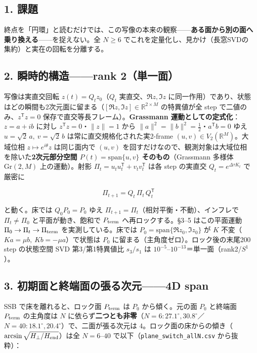 \documentclass[
  a4paper,
]{ltjsarticle}
\begin{document}
\subsection{1. 課題}\label{ux8ab2ux984c}

終点を「円環」と読むだけでは、この写像の本来の観察------\textbf{ある面から別の面へ乗り換える}------を捉えない。全
\(N\ge6\)
でこれを定量化し、見かけ（長窓SVDの集約）と実在の回転を分離する。

\subsection{2. 瞬時的構造------rank
2（単一面）}\label{ux77acux6642ux7684ux69cbux9020rank-2ux5358ux4e00ux9762}

写像は実直交回転 \(z(t)=Q_t z_0\)（\(Q_t\) 実直交、\(\Re z,\Im z\)
に同一作用）であり、状態はどの瞬間も2次元面に留まる（\([\Re z,\Im z]\in\mathbb R^{2\times M}\)
の特異値が全 step で二値のみ、\(z^{\mathsf T}z=0\)
保存で直交等長フレーム）。\textbf{Grassmann
運動としての定式化}：\(z=a+ib\) に対し \(z^{\mathsf T}z=0\)・\(\|z\|=1\)
から \(\|a\|^2=\|b\|^2=\tfrac12\)・\(a^{\mathsf T}b=0\) ゆえ
\(u=\sqrt2\,a,\ v=\sqrt2\,b\) は常に直交規格化された実2-frame
\((u,v)\in V_2(\mathbb R^M)\)。大域位相 \(z\mapsto e^{i\theta}z\)
は同じ面内で \((u,v)\)
を回すだけなので、観測対象は大域位相を除いた\textbf{2次元部分空間
\(P(t)=\mathrm{span}\{u,v\}\) そのもの}（Grassmann 多様体
\(\mathrm{Gr}(2,M)\) 上の運動）。射影
\(\Pi_t=u_tu_t^{\mathsf T}+v_tv_t^{\mathsf T}\) は各 step の実直交
\(Q_t=e^{\Delta\tau K_t}\) で厳密に

\[\Pi_{t+1}=Q_t\,\Pi_t\,Q_t^{\mathsf T}\]

と動く。床では \(Q_0P_0=P_0\) ゆえ
\(\Pi_{t+1}=\Pi_t\)（相対平衡・不動）、インフレで \(\Pi_t\neq\Pi_0\)
と平面が動き、飽和で \(P_{\rm term}\) へ再ロックする。§3--5
はこの平面運動 \(\Pi_0\to\Pi_t\to\Pi_{\rm term}\) を実測している。床では
\(P_0=\mathrm{span}\{\Re z_0,\Im z_0\}\) が \(K\)
不変（\(Ka=\mu b,\ Kb=-\mu a\)）で状態は \(P_0\)
に留まる（主角度ゼロ）。ロック後の末尾200 step の状態空間 SVD
第3/第1特異値比 \(s_3/s_1\) は
\(10^{-5}\)--\(10^{-13}\)＝単一面（rank2/\(S^1\)）。

\subsection{3. 初期面と終端面の張る次元------4D
span}\label{ux521dux671fux9762ux3068ux7d42ux7aefux9762ux306eux5f35ux308bux6b21ux51434d-span}

SSB で床を離れると、ロック面 \(P_{\rm term}\) は \(P_0\)
から傾く。元の面 \(P_0\) と終端面 \(P_{\rm term}\) の主角度は \(N\)
に依らず\textbf{二つとも非零}（\(N=6{:}27.1^\circ,30.8^\circ\)／\(N=40{:}18.1^\circ,20.4^\circ\)）で、二面が張る次元は
\(4\)。ロック面の床からの傾き（\(\arcsin\sqrt{H_\perp/H_{\rm end}}\)）は全
\(N=6\)--\(40\) で以下（\texttt{plane\_switch\_allN.csv} から抜粋）：
\end{document}

